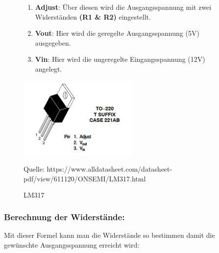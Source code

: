 \documentclass[ngerman,12pt,a4paper]{article}
\begin{document}
		\begin{figure}[htbp]
			\begin{minipage}[t]{6cm}
				\vspace{0pt}
				\begin{enumerate}
					\item 	\textbf{Adjust}: Über diesen wird die Ausgangsspannung mit zwei Widerständen \textbf{(R1 \& R2)} eingestellt.
					\item \textbf{Vout}: Hier wird die geregelte Ausgangsspannung (5V) ausgegeben.
					\item \textbf{Vin}:  Hier wird die ungeregelte Eingangsspannung (12V) angelegt.
				\end{enumerate}				
			\end{minipage}
			\hfill
			\begin{minipage}[t]{6cm}
				\vspace{0pt}
				\centering
				\includegraphics{Pictures/LM317}
				\caption{LM317}
				\label{fig: LM317}
				\vspace{-10pt}
				\begin{center}
					\par\small Quelle: https://www.alldatasheet.com/datasheet-pdf/view/611120/ONSEMI/LM317.html
				\end{center}
			\end{minipage}
		\end{figure}
		
		\subsubsection*{Berechnung der Widerstände:}
		Mit dieser Formel kann man die Widerstände so bestimmen damit die gewünschte Ausgangsspannung erreicht wird:
		
\end{document}
